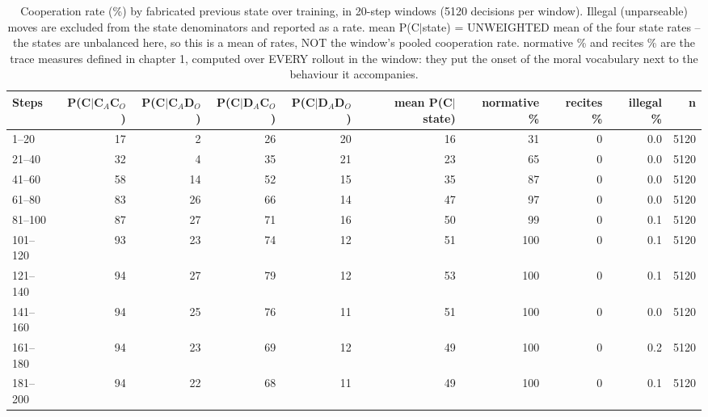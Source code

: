 \begin{table}[t]
\centering
\caption{Cooperation rate (\%) by fabricated previous state over training, in 20-step windows (5120 decisions per window). Illegal (unparseable) moves are excluded from the state denominators and reported as a rate. mean P(C$\mid$state) = UNWEIGHTED mean of the four state rates -- the states are unbalanced here, so this is a mean of rates, NOT the window's pooled cooperation rate. normative \% and recites \% are the trace measures defined in chapter 1, computed over EVERY rollout in the window: they put the onset of the moral vocabulary next to the behaviour it accompanies.}
\label{tab:trajectory-gemma_run2_200}
\small
\setlength{\tabcolsep}{3.5pt}
\begin{tabular}{lrrrrrrrrr}
\toprule
Steps & P(C$\mid$C$_A$C$_O$) & P(C$\mid$C$_A$D$_O$) & P(C$\mid$D$_A$C$_O$) & P(C$\mid$D$_A$D$_O$) & mean P(C$\mid$state) & normative \% & recites \% & illegal \% & n \\
\midrule
1–20 & 17 & 2 & 26 & 20 & 16 & 31 & 0 & 0.0 & 5120 \\
21–40 & 32 & 4 & 35 & 21 & 23 & 65 & 0 & 0.0 & 5120 \\
41–60 & 58 & 14 & 52 & 15 & 35 & 87 & 0 & 0.0 & 5120 \\
61–80 & 83 & 26 & 66 & 14 & 47 & 97 & 0 & 0.0 & 5120 \\
81–100 & 87 & 27 & 71 & 16 & 50 & 99 & 0 & 0.1 & 5120 \\
101–120 & 93 & 23 & 74 & 12 & 51 & 100 & 0 & 0.1 & 5120 \\
121–140 & 94 & 27 & 79 & 12 & 53 & 100 & 0 & 0.1 & 5120 \\
141–160 & 94 & 25 & 76 & 11 & 51 & 100 & 0 & 0.0 & 5120 \\
161–180 & 94 & 23 & 69 & 12 & 49 & 100 & 0 & 0.2 & 5120 \\
181–200 & 94 & 22 & 68 & 11 & 49 & 100 & 0 & 0.1 & 5120 \\
\bottomrule
\end{tabular}
\end{table}
